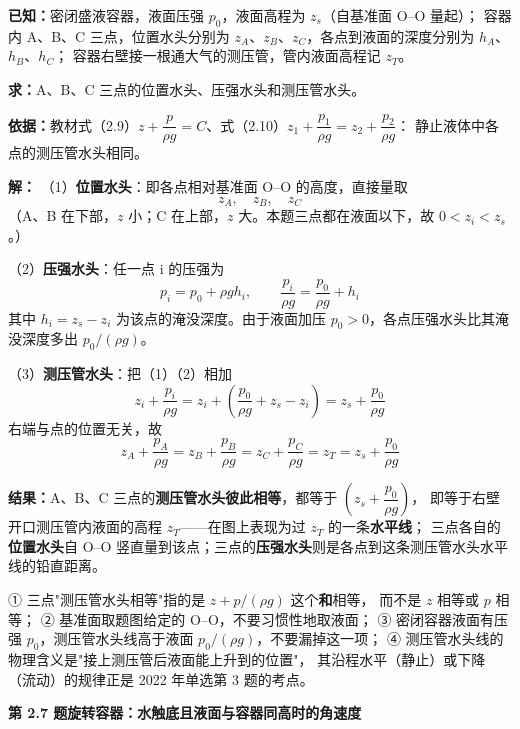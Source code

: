 \begin{jie}
\textbf{已知：}密闭盛液容器，液面压强 $p_0$，液面高程为 $z_s$（自基准面 O--O 量起）；
容器内 A、B、C 三点，位置水头分别为 $z_A$、$z_B$、$z_C$，各点到液面的深度分别为 $h_A$、$h_B$、$h_C$；
容器右壁接一根通大气的测压管，管内液面高程记 $z_T$。

\textbf{求：}A、B、C 三点的位置水头、压强水头和测压管水头。

\textbf{依据：}教材式（2.9）$z+\dfrac{p}{\rho g}=C$、式（2.10）$z_1+\dfrac{p_1}{\rho g}=z_2+\dfrac{p_2}{\rho g}$：
静止液体中各点的测压管水头相同。

\textbf{解：}
（1）\textbf{位置水头}：即各点相对基准面 O--O 的高度，直接量取
\[ z_A,\quad z_B,\quad z_C \]
（A、B 在下部，$z$ 小；C 在上部，$z$ 大。本题三点都在液面以下，故 $0<z_i<z_s$。）

（2）\textbf{压强水头}：任一点 i 的压强为
\[ p_i=p_0+\rho g h_i,\qquad \frac{p_i}{\rho g}=\frac{p_0}{\rho g}+h_i \]
其中 $h_i=z_s-z_i$ 为该点的淹没深度。由于液面加压 $p_0>0$，各点压强水头比其淹没深度多出 $p_0/(\rho g)$。

（3）\textbf{测压管水头}：把（1）（2）相加
\[ z_i+\frac{p_i}{\rho g}=z_i+\left(\frac{p_0}{\rho g}+z_s-z_i\right)=z_s+\frac{p_0}{\rho g} \]
右端与点的位置无关，故
\[ z_A+\frac{p_A}{\rho g}=z_B+\frac{p_B}{\rho g}=z_C+\frac{p_C}{\rho g}=z_T=z_s+\frac{p_0}{\rho g} \]

\textbf{结果：}A、B、C 三点的\textbf{测压管水头彼此相等}，都等于 $\left(z_s+\dfrac{p_0}{\rho g}\right)$，
即等于右壁开口测压管内液面的高程 $z_T$——在图上表现为过 $z_T$ 的一条\textbf{水平线}；
三点各自的\textbf{位置水头}自 O--O 竖直量到该点；三点的\textbf{压强水头}则是各点到这条测压管水头水平线的铅直距离。
\end{jie}

\begin{yicuo}
① 三点"测压管水头相等"指的是 $z+p/(\rho g)$ 这个\textbf{和}相等，
而不是 $z$ 相等或 $p$ 相等；
② 基准面取题图给定的 O--O，不要习惯性地取液面；
③ 密闭容器液面有压强 $p_0$，测压管水头线高于液面 $p_0/(\rho g)$，不要漏掉这一项；
④ 测压管水头线的物理含义是"接上测压管后液面能上升到的位置"，
其沿程水平（静止）或下降（流动）的规律正是 2022 年单选第 3 题的考点。
\end{yicuo}

\noindent\textbf{第 2.7 题\quad 旋转容器：水触底且液面与容器同高时的角速度}


